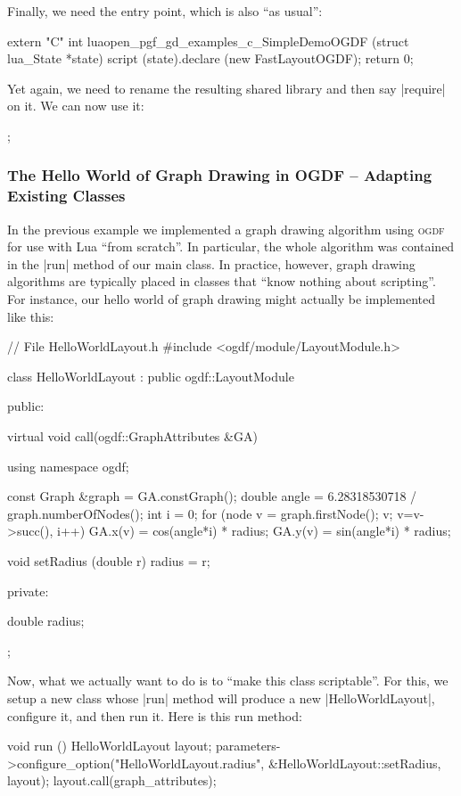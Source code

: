 Finally, we need the entry point, which is also ``as usual'':
%
\begin{codeexample}[code only, tikz syntax=false]
extern "C" int luaopen_pgf_gd_examples_c_SimpleDemoOGDF (struct lua_State *state) {
  script (state).declare (new FastLayoutOGDF);
  return 0;
}
\end{codeexample}

Yet again, we need to rename the resulting shared library and then say
|require| on it. We can now use it:
%
\begin{codeexample}
\tikz {};
\end{codeexample}


\subsubsection{The Hello World of Graph Drawing in OGDF -- Adapting Existing Classes}

In the previous example we implemented a graph drawing algorithm using
\textsc{ogdf} for use with Lua ``from scratch''. In particular, the whole
algorithm was contained in the |run| method of our main class. In practice,
however, graph drawing algorithms are typically placed in classes that ``know
nothing about scripting''. For instance, our hello world of graph drawing might
actually be implemented like this:
%
\begin{codeexample}[code only, tikz syntax=false]
// File HelloWorldLayout.h
#include <ogdf/module/LayoutModule.h>

class HelloWorldLayout : public ogdf::LayoutModule {
public:

  virtual void call(ogdf::GraphAttributes &GA)
  {
    using namespace ogdf;

    const Graph &graph = GA.constGraph();
    double angle  = 6.28318530718 / graph.numberOfNodes();
    int i = 0;
    for (node v = graph.firstNode(); v; v=v->succ(), i++) {
      GA.x(v) = cos(angle*i) * radius;
      GA.y(v) = sin(angle*i) * radius;
    }
  }

  void setRadius (double r) { radius = r; }

private:

  double radius;
};
\end{codeexample}

Now, what we actually want to do is to ``make this class scriptable''. For
this, we setup a new class whose |run| method will produce a new
|HelloWorldLayout|, configure it, and then run it. Here is this run method:
%
\begin{codeexample}[code only, tikz syntax=false]
void run ()
{
  HelloWorldLayout layout;
  parameters->configure_option("HelloWorldLayout.radius", &HelloWorldLayout::setRadius, layout);
  layout.call(graph_attributes);
}
\end{codeexample}

